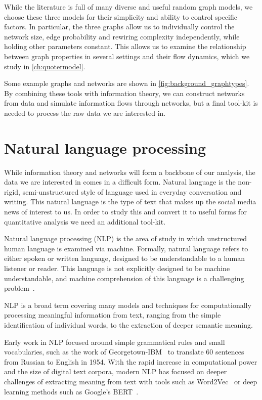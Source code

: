 While the literature is full of many diverse and useful random graph models, we choose these three models for their simplicity and ability to control specific factors. In particular, the three graphs allow us to individually control the network size, edge probability and rewiring complexity independently, while holding other parameters constant. This allows us to examine the relationship between graph properties in several settings and their flow dynamics, which we study in \autoref{ch:quotermodel}.

Some example graphs and networks are shown in \autoref{fig:background_graphtypes}. By combining these tools with information theory, we can construct networks from data and simulate information flows through networks, but a final tool-kit is needed to process the raw data we are interested in.


\section{Natural language processing}

While information theory and networks will form a backbone of our analysis, the data we are interested in comes in a difficult form. Natural language is the non-rigid, semi-unstructured style of language used in everyday conversation and writing. This natural language is the type of text that makes up the social media news of interest to us. In order to study this and convert it to useful forms for quantitative analysis we need an additional tool-kit.

Natural language processing (NLP) is the area of study in which unstructured human language is examined via machine. Formally, natural language refers to either spoken or written language, designed to be understandable to a human listener or reader. This language is not explicitly designed to be machine understandable, and machine comprehension of this language is a challenging problem~\cite{baeza-yates_challenges_2004}.

NLP is a broad term covering many models and techniques for computationally processing meaningful information from text, ranging from the simple identification of individual words, to the extraction of deeper semantic meaning. 

Early work in NLP focused around simple grammatical rules and small vocabularies, such as the work of Georgetown-IBM~\cite{hutchins_first_1997} to translate 60 sentences from Russian to English in 1954. With the rapid increase in computational power and the size of digital text corpora, modern NLP has focused on deeper challenges of extracting meaning from text with tools such as Word2Vec~\cite{mikolov_distributed_2013, mikolov_efficient_2013} or deep learning methods such as Google's BERT~\cite{devlin_bert_2019}.

